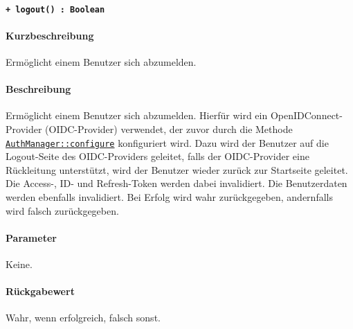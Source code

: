 \paragraph{\texttt{+ logout() : Boolean}}\label{AP_AuthManager_logout}%
\paragraph*{Kurzbeschreibung}
Ermöglicht einem Benutzer sich abzumelden.
\paragraph*{Beschreibung}
Ermöglicht einem Benutzer sich abzumelden.
Hierfür wird ein OpenIDConnect-Provider (OIDC-Provider) verwendet, der zuvor durch die Methode \hyperref[AP_AuthManager_configure]{\texttt{AuthManager::configure}} konfiguriert wird.
Dazu wird der Benutzer auf die Logout-Seite des OIDC-Providers geleitet, falls der OIDC-Provider eine Rückleitung unterstützt, wird der Benutzer wieder zurück zur Startseite geleitet.
Die Access-, ID- und Refresh-Token werden dabei invalidiert.
Die Benutzerdaten werden ebenfalls invalidiert.
Bei Erfolg wird wahr zurückgegeben, andernfalls wird falsch zurückgegeben.
\paragraph*{Parameter}
Keine.
\paragraph*{Rückgabewert}
Wahr, wenn erfolgreich, falsch sonst.
